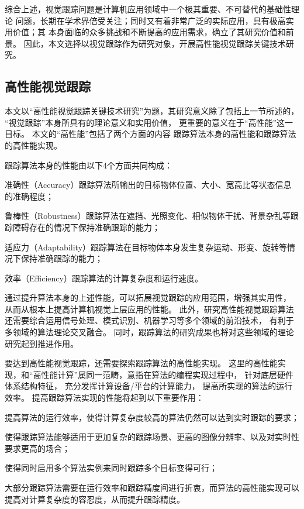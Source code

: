 综合上述，视觉跟踪问题是计算机应用领域中一个极其重要、不可替代的基础性理论
问题，长期在学术界倍受关注；同时又有着非常广泛的实际应用，具有极高实用价值；其
本身面临的众多挑战和不断提高的应用需求，确立了其研究价值和前景。
因此，本文选择以视觉跟踪作为研究对象，开展高性能视觉跟踪关键技术研究。


\subsection{高性能视觉跟踪}
本文以``高性能视觉跟踪关键技术研究''为题，其研究意义除了包括上一节所述的，
``视觉跟踪''本身所具有的理论意义和实用价值，
更重要的意义在于``高性能''这一目标。
本文的``高性能''包括了两个方面的内容\pozhehao 
跟踪算法本身的高性能和跟踪算法的高性能实现。

跟踪算法本身的性能由以下4个方面共同构成：
\begin{compactitem}
\item 准确性（Accuracy）\pozhehao 跟踪算法所输出的目标物体位置、大小、宽高比等状态信息的准确程度；
\item 鲁棒性（Robustness）\pozhehao 跟踪算法在遮挡、光照变化、相似物体干扰、背景杂乱等跟踪障碍存在的情况下保持准确跟踪的能力；
\item 适应力（Adaptability）\pozhehao 跟踪算法在目标物体本身发生复杂运动、形变、旋转等情况下保持准确跟踪的能力；
\item 效率（Efficiency）\pozhehao 跟踪算法的计算复杂度和运行速度。
\end{compactitem}
通过提升算法本身的上述性能，可以拓展视觉跟踪的应用范围，增强其实用性，
从而从根本上提高计算机视觉上层应用的性能。
此外，研究高性能视觉跟踪算法还需要综合运用信号处理、模式识别、机器学习等多个领域的前沿技术，
有利于多领域的算法理论交叉融合。
同时，跟踪算法的研究成果也将对这些领域的理论研究起到推进作用。

要达到高性能视觉跟踪，还需要探索跟踪算法的高性能实现。
这里的高性能实现，和``高性能计算''属同一范畴，意指在算法的编程实现过程中，
针对底层硬件体系结构特征，
充分发挥计算设备/平台的计算能力，
提高所实现的算法的运行效率。
提高跟踪算法实现的性能将起到以下重要作用：
\begin{compactitem}
\item	提高算法的运行效率，使得计算复杂度较高的算法仍然可以达到实时跟踪的要求；
\item	使得跟踪算法能够适用于更加复杂的跟踪场景、更高的图像分辨率、以及对实时性要求更高的场合；
\item	使得同时启用多个算法实例来同时跟踪多个目标变得可行；
\item	大部分跟踪算法需要在运行效率和跟踪精度间进行折衷，而算法的高性能实现可以提高对计算复杂度的容忍度，从而提升跟踪精度。
\end{compactitem}

